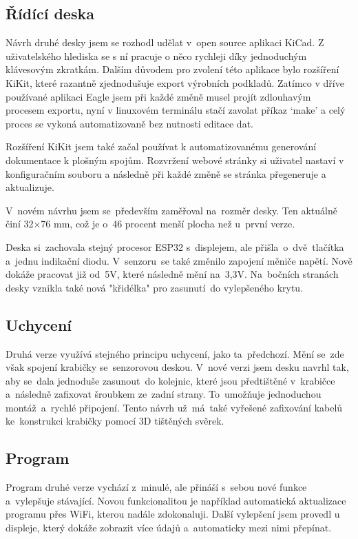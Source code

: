 \subsection{Řídící deska}
Návrh druhé desky jsem se rozhodl udělat v~open source aplikaci KiCad.
Z uživatelského hlediska se s ní pracuje o něco rychleji díky jednoduchým klávesovým zkratkám. 
Dalším důvodem pro zvolení této aplikace bylo rozšíření KiKit, které razantně zjednodušuje export výrobních podkladů.
Zatímco v dříve používané aplikaci Eagle jsem při každé změně musel projít zdlouhavým procesem exportu, nyní v linuxovém terminálu stačí zavolat příkaz `make' a celý proces se vykoná automatizovaně bez nutnosti editace dat.

Rozšíření KiKit jsem také začal používat k automatizovanému generování dokumentace k plošným spojům.
Rozvržení webové stránky si uživatel nastaví v konfiguračním souboru a následně při každé změně se stránka přegeneruje a aktualizuje.

V~novém návrhu jsem se~především zaměřoval na~rozměr desky.
Ten aktuálně činí 32$\times$76 mm, což je o~46 procent menší plocha než u~první verze.

Deska si~zachovala stejný procesor ESP32 s~displejem, ale přišla~o~dvě~tlačítka a~jednu indikační diodu.
V~senzoru~se také změnilo zapojení měniče napětí.
Nově dokáže pracovat již od~5V, které následně mění na~3,3V.
Na~bočních stranách desky vznikla také nová "křidélka" pro zasunutí~do vylepšeného krytu.



\subsection{Uchycení}
Druhá verze využívá stejného principu uchycení, jako ta~předchozí. 
Mění se~zde však spojení krabičky se~senzorovou deskou. 
V~nové verzi jsem desku navrhl tak, aby se~dala jednoduše zasunout~do kolejnic, které jsou předtištěné v~krabičce a~následně zafixovat šroubkem ze~zadní strany.
To~umožňuje jednoduchou montáž~a~rychlé připojení.
Tento návrh už~má~také vyřešené zafixování kabelů ke~konstrukci krabičky pomocí 3D tištěných svěrek.


\subsection{Program}
Program druhé verze vychází z~minulé, ale přináší s~sebou nové funkce a~vylepšuje stávající.
Novou funkcionalitou je například automatická aktualizace programu přes WiFi, kterou nadále zdokonaluji.
Další vylepšení jsem provedl u displeje, který dokáže zobrazit více údajů a~automaticky mezi nimi přepínat.

